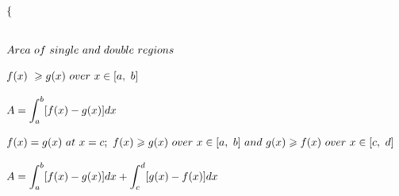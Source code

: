 \documentclass{article}
\begin{document}
\[\begin{array}{>{\displaystyle}l}
\begin{cases}
    \end{cases} \ 
    \\
    \\
    \\
    Area\ of\ single\ and\ double\ regions\\
    \\
    f( x) \ \geqslant g( x) \ over\ x\in [ a,\ b]\\
    \\
    A=\int ^{b}_{a}[ f( x) -g( x)] dx\ \\
    \\
    f( x) =g( x) \ at\ x=c;\ f( x) \geqslant g( x) \ over\ x\in [ a,\ b] \ and\ g( x) \geqslant f( x) \ over\ x\in [ c,\ d]\\
    \\
A=\int ^{b}_{a}[ f( x) -g( x)] dx+\int ^{d}_{c}[ g( x) -f( x)] dx
\end{array}
\]

\newpage
\end{document}
